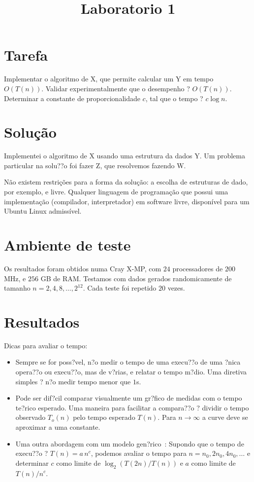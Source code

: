 \documentclass{article}
\title{Laboratorio 1}
\author{}{J. Rapidez}
\begin{document}
\maketitle

\section{Tarefa}
Implementar o algoritmo de X, que permite calcular um Y em tempo $O(T(n))$. Validar experimentalmente que o
desempenho ? $O(T(n))$. Determinar a constante de proporcionalidade $c$, tal que o tempo ? $c \log n$.

\section{Solução}
Implementei o algoritmo de X usando uma estrutura da dados Y. Um
problema particular na solu??o foi fazer Z, que resolvemos fazendo W.

\begin{shaded}
  Não existem restrições para a forma da solução: a escolha de estruturas de dado, por exemplo, e
  livre. Qualquer linguagem de programação que possui uma implementação (compilador, interpretador) em
  software livre, disponível para um Ubuntu Linux admissível.
\end{shaded}

\section{Ambiente de teste}

Os resultados foram obtidos numa Cray X-MP, com $24$ processadores de
$200$ MHz, e $256$ GB de RAM. Testamos com dados gerados
randomicamente de tamanho $n=2,4,8,\ldots,2^{12}$. Cada teste foi
repetido $20$ vezes.

\section{Resultados}

\begin{shaded}
  Dicas para avaliar o tempo:
  \begin{itemize}
  \item Sempre se for poss?vel, n?o medir o tempo de uma execu??o de uma ?nica opera??o ou execu??o, mas de
    v?rias, e relatar o tempo m?dio. Uma diretiva simples ? n?o medir tempo menor que $1$s.
  \item Pode ser dif?cil comparar visualmente um gr?fico de medidas com o tempo te?rico esperado. Uma maneira
    para facilitar a compara??o ? dividir o tempo observado $T_o(n)$ pelo tempo esperado $T(n)$. Para
    $n\rightarrow\infty$ a curve deve se aproximar a uma constante.
  \item Uma outra abordagem com um modelo gen?rico~\parencite{Sedgewick/2011}: Supondo que o tempo de execu??o
    ? $T(n)=a\,n^c$, podemos avaliar o tempo para $n=n_0,2n_0,4n_0,\ldots$ e determinar $c$ como limite de
    $\log_2(T(2n)/T(n))$ e $a$ como limite de $T(n)/n^c$.
  \end{itemize}
\end{shaded}
\end{document}
